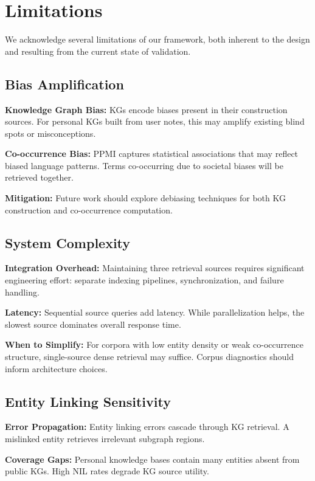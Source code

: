 \documentclass[11pt,a4paper]{article}
\begin{document}
\section{Limitations}
\label{sec:limitations}

We acknowledge several limitations of our framework, both inherent to the design and resulting from the current state of validation.

\subsection{Bias Amplification}

\textbf{Knowledge Graph Bias:} KGs encode biases present in their construction sources. For personal KGs built from user notes, this may amplify existing blind spots or misconceptions.

\textbf{Co-occurrence Bias:} PPMI captures statistical associations that may reflect biased language patterns. Terms co-occurring due to societal biases will be retrieved together.

\textbf{Mitigation:} Future work should explore debiasing techniques for both KG construction and co-occurrence computation.

\subsection{System Complexity}

\textbf{Integration Overhead:} Maintaining three retrieval sources requires significant engineering effort: separate indexing pipelines, synchronization, and failure handling.

\textbf{Latency:} Sequential source queries add latency. While parallelization helps, the slowest source dominates overall response time.

\textbf{When to Simplify:} For corpora with low entity density or weak co-occurrence structure, single-source dense retrieval may suffice. Corpus diagnostics should inform architecture choices.

\subsection{Entity Linking Sensitivity}

\textbf{Error Propagation:} Entity linking errors cascade through KG retrieval. A mislinked entity retrieves irrelevant subgraph regions.

\textbf{Coverage Gaps:} Personal knowledge bases contain many entities absent from public KGs. High NIL rates degrade KG source utility.
\end{document}
